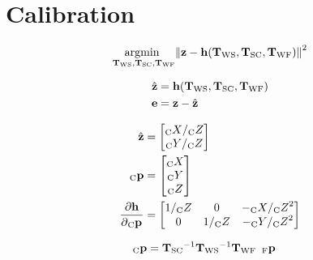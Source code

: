 \chapter{Calibration}

\begin{align}
  \Argmin{\Tf{\world}{\sensor}, \Tf{\sensor}{\cam}, \Tf{\world}{\fiducial}}
  \Norm{
    \measurement
    - \projFunc(\Tf{\world}{\sensor}, \Tf{\sensor}{\cam}, \Tf{\world}{\fiducial})
  }^{2}
\end{align}

\begin{align}
  \hat{\measurement} &=
    \projFunc(\Tf{\world}{\sensor},
              \Tf{\sensor}{\cam},
              \Tf{\world}{\fiducial}) \\
  \Vec{e} &= \measurement - \hat{\measurement}
\end{align}

\begin{align}
  \hat{\measurement}
		&=
			\begin{bmatrix}
				\KineNotationBare{X}{\cam} / \KineNotationBare{Z}{\cam} \\
				\KineNotationBare{Y}{\cam} / \KineNotationBare{Z}{\cam}
			\end{bmatrix} \\
  \Point{\cam}{\fiducial_{i}}
		&=
			\begin{bmatrix}
				\KineNotationBare{X}{\cam} \\
				\KineNotationBare{Y}{\cam} \\
				\KineNotationBare{Z}{\cam}
			\end{bmatrix} \\
  \dfrac{\partial{\projFunc}}{\partial{\Pt{\cam}}}
		&=
			\begin{bmatrix}
				1 / \KineNotationBare{Z}{\cam}
				& 0
				& -\KineNotationBare{X}{\cam} / \KineNotationBare{Z}{\cam}^{2} \\
				0
				& 1 / \KineNotationBare{Z}{\cam}
				& -\KineNotationBare{Y}{\cam} / \KineNotationBare{Z}{\cam}^{2}
			\end{bmatrix}
\end{align}

\begin{align}
  \Point{\cam}{\fiducial_{ij}}
  &=
  \Tf{\sensor}{\cam}^{-1}
  \Tf{\world}{\sensor}^{-1}
  \Tf{\world}{\fiducial}
  \enspace \Point{\fiducial}{\fiducial_{ij}}
\end{align}



